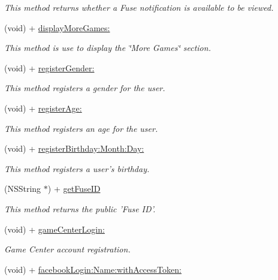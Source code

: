 \begin{DoxyCompactItemize}
\begin{DoxyCompactList}\small\item\em This method returns whether a Fuse notification is available to be viewed. \end{DoxyCompactList}\item 
(void) + \hyperlink{interface_fuse_a_p_i_aced6aa0cc51278b431c664c3f5f9fc30}{display\+More\+Games\+:}
\begin{DoxyCompactList}\small\item\em This method is use to display the \char`\"{}\+More Games\char`\"{} section. \end{DoxyCompactList}\item 
(void) + \hyperlink{interface_fuse_a_p_i_a2b0c7be7abc4ec4ae6912f295d21e64c}{register\+Gender\+:}
\begin{DoxyCompactList}\small\item\em This method registers a gender for the user. \end{DoxyCompactList}\item 
(void) + \hyperlink{interface_fuse_a_p_i_a33903ca8d52be440186c4bbf1cbe510c}{register\+Age\+:}
\begin{DoxyCompactList}\small\item\em This method registers an age for the user. \end{DoxyCompactList}\item 
(void) + \hyperlink{interface_fuse_a_p_i_a5dcbaec8b00d90c4970e1b752e5dc719}{register\+Birthday\+:\+Month\+:\+Day\+:}
\begin{DoxyCompactList}\small\item\em This method registers a user's birthday. \end{DoxyCompactList}\item 
(N\+S\+String $\ast$) + \hyperlink{interface_fuse_a_p_i_ab483c2a3f4439aad8e19200cf24ff731}{get\+Fuse\+I\+D}
\begin{DoxyCompactList}\small\item\em This method returns the public 'Fuse I\+D'. \end{DoxyCompactList}\item 
(void) + \hyperlink{interface_fuse_a_p_i_a02a3bc5562d4f6e50bac5339f4ac4046}{game\+Center\+Login\+:}
\begin{DoxyCompactList}\small\item\em Game Center account registration. \end{DoxyCompactList}\item 
(void) + \hyperlink{interface_fuse_a_p_i_a7003a2102cba9c87fa127e39c95a5d1d}{facebook\+Login\+:\+Name\+:with\+Access\+Token\+:}

\end{DoxyCompactItemize}
